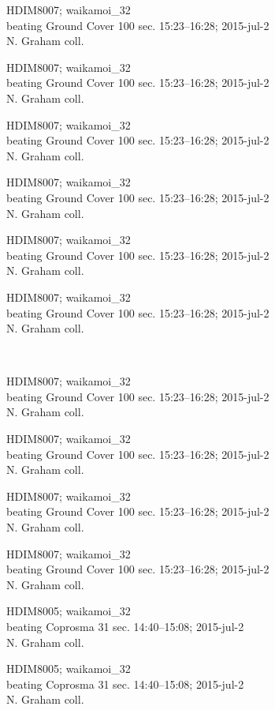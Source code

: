 \documentclass[2pt]{extarticle}
\begin{document}
\noindent
\parbox{0.16\textwidth}{\tiny \raggedright \rule[-0.3\baselineskip]{0pt}{10pt}HDIM8007; waikamoi\_32\\ beating Ground Cover 100 sec. 15:23--16:28; 2015-jul-2\\ N. Graham coll.}
\parbox{0.16\textwidth}{\tiny \raggedright \rule[-0.3\baselineskip]{0pt}{10pt}HDIM8007; waikamoi\_32\\ beating Ground Cover 100 sec. 15:23--16:28; 2015-jul-2\\ N. Graham coll.}
\parbox{0.16\textwidth}{\tiny \raggedright \rule[-0.3\baselineskip]{0pt}{10pt}HDIM8007; waikamoi\_32\\ beating Ground Cover 100 sec. 15:23--16:28; 2015-jul-2\\ N. Graham coll.}
\parbox{0.16\textwidth}{\tiny \raggedright \rule[-0.3\baselineskip]{0pt}{10pt}HDIM8007; waikamoi\_32\\ beating Ground Cover 100 sec. 15:23--16:28; 2015-jul-2\\ N. Graham coll.}
\parbox{0.16\textwidth}{\tiny \raggedright \rule[-0.3\baselineskip]{0pt}{10pt}HDIM8007; waikamoi\_32\\ beating Ground Cover 100 sec. 15:23--16:28; 2015-jul-2\\ N. Graham coll.}
\parbox{0.16\textwidth}{\tiny \raggedright \rule[-0.3\baselineskip]{0pt}{10pt}HDIM8007; waikamoi\_32\\ beating Ground Cover 100 sec. 15:23--16:28; 2015-jul-2\\ N. Graham coll.} \\ 
\vspace{0.001in} 

\noindent
\parbox{0.16\textwidth}{\tiny \raggedright \rule[-0.3\baselineskip]{0pt}{10pt}HDIM8007; waikamoi\_32\\ beating Ground Cover 100 sec. 15:23--16:28; 2015-jul-2\\ N. Graham coll.}
\parbox{0.16\textwidth}{\tiny \raggedright \rule[-0.3\baselineskip]{0pt}{10pt}HDIM8007; waikamoi\_32\\ beating Ground Cover 100 sec. 15:23--16:28; 2015-jul-2\\ N. Graham coll.}
\parbox{0.16\textwidth}{\tiny \raggedright \rule[-0.3\baselineskip]{0pt}{10pt}HDIM8007; waikamoi\_32\\ beating Ground Cover 100 sec. 15:23--16:28; 2015-jul-2\\ N. Graham coll.}
\parbox{0.16\textwidth}{\tiny \raggedright \rule[-0.3\baselineskip]{0pt}{10pt}HDIM8007; waikamoi\_32\\ beating Ground Cover 100 sec. 15:23--16:28; 2015-jul-2\\ N. Graham coll.}
\parbox{0.16\textwidth}{\tiny \raggedright \rule[-0.3\baselineskip]{0pt}{10pt}HDIM8005; waikamoi\_32\\ beating Coprosma 31 sec. 14:40--15:08; 2015-jul-2\\ N. Graham coll.}
\parbox{0.16\textwidth}{\tiny \raggedright \rule[-0.3\baselineskip]{0pt}{10pt}HDIM8005; waikamoi\_32\\ beating Coprosma 31 sec. 14:40--15:08; 2015-jul-2\\ N. Graham coll.} \\ 
\vspace{0.001in} 
\end{document}
